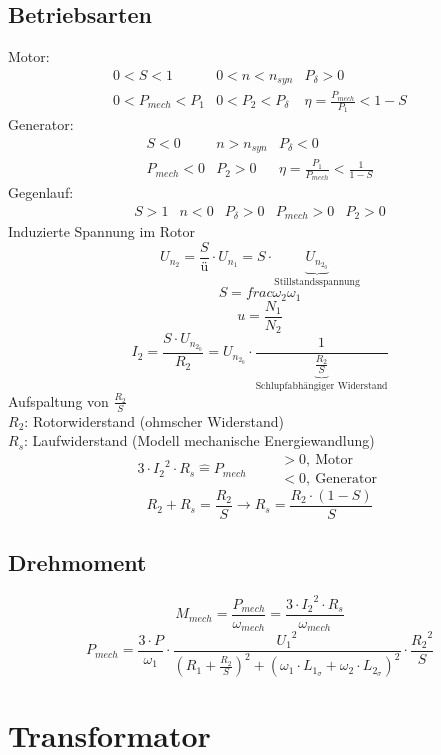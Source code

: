 \subsection{Betriebsarten}
Motor: 
\[ \begin{array}{llllll}
0 < S < 1 
  & 0 < n < n_{syn} 
  & P_\delta > 0 
  \\ 0 < P_{mech} < P_1 
  & 0 < P_2 < P_\delta 
  & \eta = \frac{P_{mech}}{P_1} < 1 - S
\end{array} \]
Generator: 
\[ \begin{array}{llllll}
S < 0 
  & n > n_{syn} 
  & P_\delta < 0 
  \\ P_{mech} < 0 
  & P_2 > 0
  & \eta = \frac{P_1}{P_{mech}} < \frac{1}{1 - S}
\end{array} \]
Gegenlauf: 
\[ \begin{array}{llllll}
S > 1 
  & n < 0
  & P_\delta > 0 
  & P_{mech} > 0
  & P_2 > 0
\end{array} \]
Induzierte Spannung im Rotor
\[ U_{n_2} = \frac{S}{ü} \cdot U_{n_1} = S \cdot \underbrace{U_{n_{2_0}}}_
{\text{Stillstandsspannung}} \]
\[ S = frac{\omega_2}{\omega_1} \]
\[ u = \frac{N_1}{N_2} \]
\[ I_2 = \frac{S \cdot U_{n_{2_0}}}{R_2} = U_{n_{2_0}} \cdot 
\frac{1}{\underbrace{\frac{R_2}{S}}_{\text{Schlupfabhängiger Widerstand}}} \]
Aufspaltung von $\frac{R_2}{S}$\\
$R_2$: Rotorwiderstand (ohmscher Widerstand)\\
$R_s$: Laufwiderstand (Modell mechanische Energiewandlung)
\[ 3 \cdot {I_2}^2 \cdot R_s \hat{=} P_{mech} 
\qquad \begin{array}{l}>0,~\text{Motor}\\<0,~\text{Generator}\end{array} \]
\[ R_2 + R_s = \frac{R_2}{S} \rightarrow R_s = \frac{R_2 \cdot (1 - S)}{S} \]

\subsection{Drehmoment}
\[ M_{mech} = \frac{P_{mech}}{\omega_{mech}} 
= \frac{3 \cdot {I_2}^2 \cdot R_s}{\omega_{mech}} \]
\[ P_{mech} = \frac{3 \cdot P}{\omega_1} \cdot 
\frac{{U_1}^2}{\left(R_1 + \frac{R_2}{S}\right)^2 + 
(\omega_1 \cdot L_{1_\sigma} + \omega_2 \cdot L_{2_\sigma})^2} \cdot 
\frac{{R_2}^2}{S} \]

\section{Transformator}

